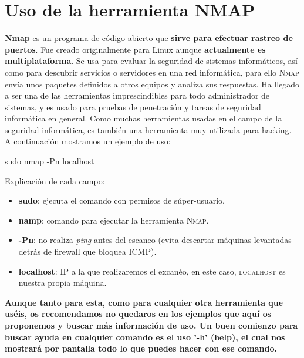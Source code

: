 \newpage
\section{Uso de la herramienta NMAP}
\textbf{Nmap} es un programa de código abierto que \textbf{sirve para efectuar rastreo de puertos}. Fue creado originalmente para Linux aunque \textbf{actualmente es multiplataforma}. \newline Se usa para evaluar la seguridad de sistemas informáticos, así como para descubrir servicios o servidores en una red informática, para ello \textsc{Nmap} envía unos paquetes definidos a otros equipos y analiza sus respuestas.
\newline Ha llegado a ser una de las herramientas imprescindibles para todo administrador de sistemas, y es usado para pruebas de penetración y tareas de seguridad informática en general.
Como muchas herramientas usadas en el campo de la seguridad informática, es también una herramienta muy utilizada para hacking.
\newline\\ A continuación mostramos un ejemplo de uso:

\begin{tcolorbox}
 \begin{center}
     sudo nmap -Pn localhost
 \end{center}
\end{tcolorbox}

Explicación de cada campo:
\begin{itemize}
    \item \textbf{sudo}: ejecuta el comando con permisos de súper-usuario.
    \item \textbf{namp}: comando para ejecutar la herramienta \textsc{Nmap}.
    \item \textbf{-Pn}: no realiza \textit{ping} antes del escaneo (evita descartar máquinas levantadas detrás de firewall que bloquea ICMP).
    \item \textbf{localhost}: IP a la que realizaremos el excanéo, en este caso, \textsc{localhost} es nuestra propia máquina.
\end{itemize}

\noindent
\textbf{Aunque tanto para esta, como para cualquier otra herramienta que uséis, os recomendamos no quedaros en los ejemplos que aquí os proponemos y buscar más información de uso. Un buen comienzo para buscar ayuda en cualquier comando es el uso \textbf{'-h' (help)}, el cual nos mostrará por pantalla todo lo que puedes hacer con ese comando.}